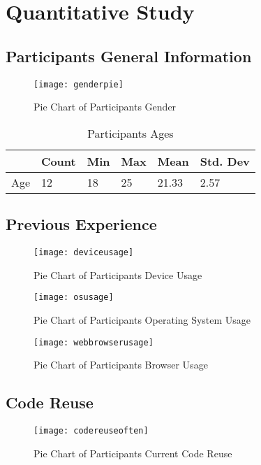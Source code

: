 \chapter{Quantitative Study}

\section{Participants General Information}
\begin{figure}[H]
\centering
\texttt{[image: genderpie]}
\caption{Pie Chart of Participants Gender \label{genderpie}}
\end{figure}



\begin{table}[H]
\centering
\caption{Participants Ages \label{agetable}}
\begin{tabular}{llllll}
\hline
  & Count & Min & Max & Mean & Std. Dev \\ \hline
Age  & 12 & 18 & 25 & 21.33 & 2.57  \\ \hline
\end{tabular}
\end{table}


\section{Previous Experience}

\begin{figure}[H]
\centering
\texttt{[image: deviceusage]}
\caption{Pie Chart of Participants Device Usage \label{deviceusage}}
\end{figure}

\begin{figure}[H]
\centering
\texttt{[image: osusage]}
\caption{Pie Chart of Participants Operating System Usage \label{osusage}}
\end{figure}

\begin{figure}[H]
\centering
\texttt{[image: webbrowserusage]}
\caption{Pie Chart of Participants Browser Usage \label{webbrowserusage}}
\end{figure}

\section{Code Reuse}

\begin{figure}[H]
\centering
\texttt{[image: codereuseoften]}
\caption{Pie Chart of Participants Current Code Reuse \label{codereuseoften}}
\end{figure}

